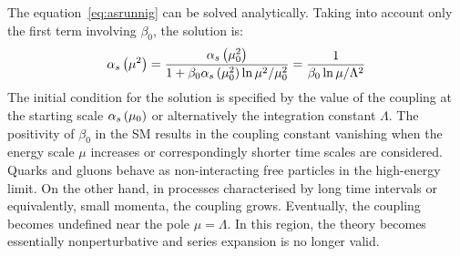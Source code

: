 The equation~\ref{eq:asrunnig} can be solved analytically. Taking into account only the first term involving $\beta_0$, the solution is:
\begin{equation}
 \mbox{$\alpha_{s}$}\left(\mu^2\right) = \dfrac{ \mbox{$\alpha_{s}$}\left(\mu_0^2\right) }{1+\beta_0\mbox{$\alpha_{s}$}\left(\mu_0^2\right)\ln{\mu^2/\mu_0^2}} = \dfrac{1}{\beta_0\ln{\mu/\Lambda^2}}
\label{eq:asrunnigsolution}
\end{equation}
The initial condition for the solution is specified by the value of the coupling at the starting scale $\mbox{$\alpha_{s}$}\left(\mu_0\right)$ or alternatively the integration constant $\Lambda$. The positivity of $\beta_0$ in the SM results in the coupling constant vanishing when the energy scale $\mu$ increases or correspondingly shorter time scales are considered. Quarks and gluons behave as non-interacting free particles in the high-energy limit. On the other hand, in processes characterised by long time intervals or equivalently, small momenta, the coupling grows. Eventually, the coupling becomes undefined near the pole $\mu = \Lambda$. In this region, the theory becomes essentially nonperturbative and series expansion is no longer valid. 

